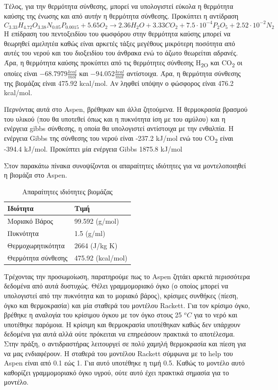 \documentclass[11pt]{article}
\begin{document}
Τέλος, για την θερμότητα σύνθεσης, μπορεί να υπολογιστεί εύκολα η θερμότητα καύσης της ένωσης και από αυτήν η θερμότητα σύνθεσης.
Προκύπτει η αντίδραση
\[  C_{3.33}H_{4.72}O_{3.38}N_{0.05}P_{0.0015} + 5.65 O_2 \rightarrow 2.36H_2O + 3.33CO_2+7.5 \cdot 10^{-4} P_2O_5 + 2.52 \cdot 10^{-2} N_2 \]
Η επίδραση του πεντοξειδίου του φωσφόρου στην θερμότητα καύσης μπορεί να θεωρηθεί αμελητέα καθώς είναι αρκετές τάξες μεγέθους μικρότερη ποσότητα από αυτές του νερού και του διοξειδίου του άνθρακα ενώ το άζωτο θεωρείται αδρανές. Άρα, η θερμότητα καύσης προκύπτει από τις θερμότητες σύνθεσης H\textsubscript{2O} και CO\textsubscript{2} οι οποίες είναι \(-68.7979 \frac{kcal}{mol}\) και \(-94.052 \frac{kcal}{mol}\) αντίστοιχα. Άρα, η θερμότητα σύνθεσης της βιομάζας είναι 475.92 kcal/mol. Αν ληφθεί υπόψην ο φώσφορος είναι 476.2 kcal/mol.

Περνόντας αυτά στο Aspen, βρέθηκαν και άλλα ζητούμενα. Η θερμοκρασία βρασμού του υλικού (που θα υποτεθεί όπως και η πυκνότητα ίση με του αμύλου) και η ενέργεια gibbs σύνθεσης, η οποία θα υπολογιστεί αντίστοιχα με την ενθαλπία. Η ενέργεια Gibbs της σύνθεσης του νερού είναι -237.2 kJ/mol ενώ του CO\textsubscript{2} είναι -394.4 kJ/mol. Προκύπτει μία ενέργεια Gibbs 1875.8 kJ/mol 

Στον παρακάτω πίνακα συνοψίζονται οι απαραίτητες ιδιότητες για να μοντελοποιηθεί η βιομάζα στο Aspen.
\begin{table}[htbp]
\caption{Απαραίτητες ιδιότητες βιομάζας}
\centering
\begin{tabular}{ll}
Ιδιότητα & Τιμή\\
\hline
Μοριακό Βάρος & 99.592 (g/mol)\\
Πυκνότητα & 1.5 (g/ml)\\
Θερμοχωρητικότητα & 2664 (J/kg K)\\
Θερμότητα σύνθεσης & 475.92 (kcal/mol)\\
\end{tabular}
\end{table}

Τρέχοντας την προσωμοίωση, παρατηρούμε πως το Aspen ζητάει αρκετά περισσότερα δεδομένα από αυτά δυστυχώς. Θέλει γραμμομοριακό όγκο (ο οποίος μπορεί να υπολογιστεί από την πυκνότητα και το μοριακό βάρος), κρίσιμες συνθήκες (πίεση, όγκο και θερμοκρασία) και μία σταθερά του μοντέλου Rackett. Για τον κρίσιμο όγκο, βρέθηκε η αναλογία του κρίσιμου όγκου με τον όγκο στους 25 \(^oC\) για το νερό και υποτέθηκε παρόμοια. Η κρίσιμη και θερμοκρασία υποτέθηκαν καθώς δεν υπάρχουν δεδομένα για αυτά αλλά ούτε πρόκειται να επηρεάσουν πρακτικά το αποτέλεσμα. Στην πράξη, ο αντιδραστήρας λειτουργεί σε πολύ χαμηλή θερμοκρασία και πίεση για να μας ενδιαφέρουν. Η σταθερά του μοντέλου Rackett σύμφωνα με το help του Aspen είναι από 0.1 εώς 1. Για αυτό υποτέθηκε η τιμή 0.5. Καθώς το μοντέλο αυτό καθορίζει γραμμομοριακό όγκο υγρού, ούτε αυτό έχει πρακτικά σημασία για το μοντέλο.
\end{document}
